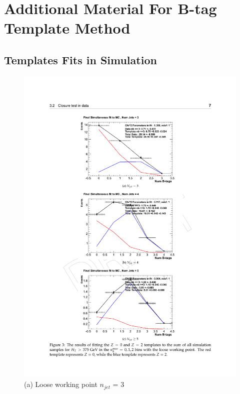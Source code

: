 \chapter{Additional Material  For B-tag Template Method}
\label{app:templatematerial}
\section{Templates Fits in Simulation}
\label{app:templatemc}


\begin{figure}[ht]
\centering
\begin{minipage}[b]{0.55 \linewidth}
\includegraphics[width = 1.0\linewidth]{plots/template_mc_loose_njet3.pdf}
\centering (a) Loose working point $n_{jet}$ = 3 
\end{minipage}
\quad
\begin{minipage}[b]{0.55\linewidth}

\end{minipage}
\end{figure}
